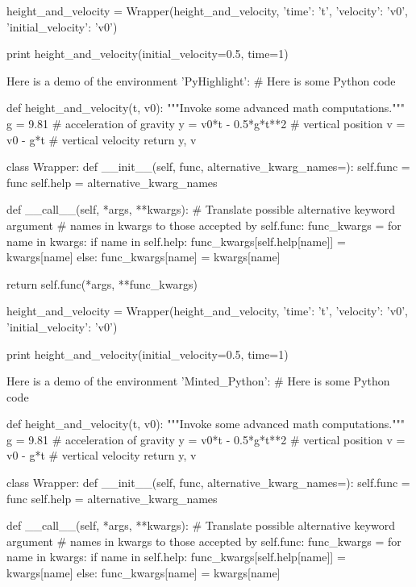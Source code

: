 height_and_velocity = Wrapper(height_and_velocity,
                              {'time': 't',
                               'velocity': 'v0',
                               'initial_velocity': 'v0'})

print height_and_velocity(initial_velocity=0.5, time=1)


\noindent
Here is a demo of the environment 'PyHighlight':
# Here is some Python code

def height_and_velocity(t, v0):
    """Invoke some advanced math computations."""
    g = 9.81                  # acceleration of gravity
    y = v0*t - 0.5*g*t**2     # vertical position
    v = v0 - g*t              # vertical velocity
    return y, v

class Wrapper:
    def __init__(self, func, alternative_kwarg_names={}):
        self.func = func
        self.help = alternative_kwarg_names

    def __call__(self, *args, **kwargs):
        # Translate possible alternative keyword argument
        # names in kwargs to those accepted by self.func:
        func_kwargs = {}
        for name in kwargs:
            if name in self.help:
                func_kwargs[self.help[name]] = kwargs[name]
            else:
                func_kwargs[name] = kwargs[name]

        return self.func(*args, **func_kwargs)

height_and_velocity = Wrapper(height_and_velocity,
                              {'time': 't',
                               'velocity': 'v0',
                               'initial_velocity': 'v0'})

print height_and_velocity(initial_velocity=0.5, time=1)


\noindent
Here is a demo of the environment 'Minted\_Python':
# Here is some Python code

def height_and_velocity(t, v0):
    """Invoke some advanced math computations."""
    g = 9.81                  # acceleration of gravity
    y = v0*t - 0.5*g*t**2     # vertical position
    v = v0 - g*t              # vertical velocity
    return y, v

class Wrapper:
    def __init__(self, func, alternative_kwarg_names={}):
        self.func = func
        self.help = alternative_kwarg_names

    def __call__(self, *args, **kwargs):
        # Translate possible alternative keyword argument
        # names in kwargs to those accepted by self.func:
        func_kwargs = {}
        for name in kwargs:
            if name in self.help:
                func_kwargs[self.help[name]] = kwargs[name]
            else:
                func_kwargs[name] = kwargs[name]

